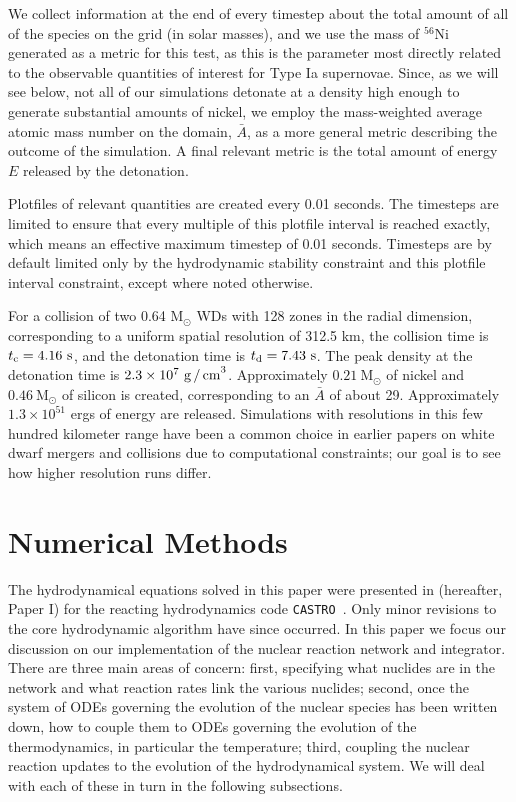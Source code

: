 \documentclass[twocolumn,numberedappendix]{../aastex6}
\newcommand{\msolar}{\mathrm{M}_\odot}
\newcommand{\castro}{\texttt{CASTRO}}
\begin{document}
We collect information at the end of every timestep about the total amount of
all of the species on the grid (in solar masses), and we use the mass of $^{56}$Ni
generated as a metric for this test, as this is the parameter most directly related
to the observable quantities of interest for Type Ia supernovae. Since, as we will see
below, not all of our simulations detonate at a density high enough to generate substantial
amounts of nickel, we employ the mass-weighted average atomic mass number on the domain,
$\bar{A}$, as a more general metric describing the outcome of the simulation. A
final relevant metric is the total amount of energy $E$ released by the detonation.

Plotfiles of relevant quantities are created every 0.01 seconds.
The timesteps are limited to ensure that every multiple of this plotfile interval is
reached exactly, which means an effective maximum timestep of 0.01 seconds. Timesteps
are by default limited only by the hydrodynamic stability constraint and this plotfile
interval constraint, except where noted otherwise.

For a collision of two 0.64 $\msolar$ WDs with 128 zones in the radial dimension,
corresponding to a uniform spatial resolution of 312.5 km, the collision time is
$t_{\rm c} = 4.16\ \text{s}$, and the detonation time is $t_{\rm d} = 7.43\ \text{s}$.
The peak density at the detonation time is $2.3 \times 10^7\ \text{g\,/\,cm}^3$.
Approximately $0.21\ \msolar$ of nickel and $0.46\ \msolar$ of silicon is created,
corresponding to an $\bar{A}$ of about 29. Approximately $1.3 \times 10^{51}$
ergs of energy are released. Simulations with resolutions in this few hundred kilometer
range have been a common choice in earlier papers on white dwarf mergers and collisions
due to computational constraints; our goal is to see how higher resolution runs differ.



\section{Numerical Methods}
\label{sec:numericalmethods}

The hydrodynamical equations solved in this paper were presented in \citet{wdmergerI}
(hereafter, Paper I) for the reacting hydrodynamics code \castro\ \citep{castro}.
Only minor revisions to the core hydrodynamic algorithm have since occurred.
In this paper we focus our discussion on our implementation of the nuclear
reaction network and integrator. There are three main areas of concern: first,
specifying what nuclides are in the network and what reaction rates link the
various nuclides; second, once the system of ODEs governing the evolution of
the nuclear species has been written down, how to couple them to ODEs governing
the evolution of the thermodynamics, in particular the temperature; third,
coupling the nuclear reaction updates to the evolution of the hydrodynamical
system. We will deal with each of these in turn in the following subsections.
\end{document}

